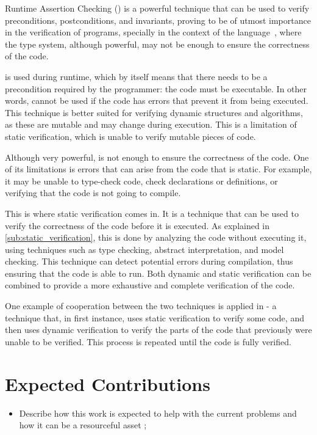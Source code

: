 Runtime Assertion Checking (\rac) is a powerful technique that can be used to verify preconditions, postconditions, and 
invariants, proving to be of utmost importance in the verification of programs, specially 
in the context of the \ocaml language~\cite{Filliatre}, where the type system, 
although powerful, may not be enough to ensure the correctness of the code.

\rac is used during runtime, which by itself means that there needs to be a precondition required 
by the programmer: the code must be executable. In other words, \rac cannot be used if the code 
has errors that prevent it from being executed. This technique is better suited for verifying dynamic 
structures and algorithms, as these are mutable and may change during execution. This is a limitation 
of static verification, which is unable to verify mutable pieces of code.

Although very powerful, \rac is not enough to ensure the correctness of the code. One of its 
limitations is errors that can arise from the code that is static. For example, it may be unable 
to type-check code, check declarations or definitions, or verifying that the code is not going to 
compile.

This is where static verification comes in. It is a technique that can be used to verify the 
correctness of the code before it is executed. As explained in \ref{sub:static_verification}, this is done by analyzing the code without 
executing it, using techniques such as type checking, abstract interpretation, and model checking.
This technique can detect potential errors during compilation, thus ensuring that the code is 
able to run. Both dynamic and static verification can be combined to provide a more exhaustive 
and complete verification of the code.

One example of cooperation between the two techniques is applied in \monitors - a technique that, 
in first instance, uses static verification to verify some code, and then uses dynamic verification 
to verify the parts of the code that previously were unable to be verified. This process is repeated until 
the code is fully verified.

\section{Expected Contributions}
\label{sec:expected_Contributions}

\begin{itemize}
    \item Describe how this work is expected to help with the current problems
    and how it can be a resourceful asset ;
\end{itemize}

